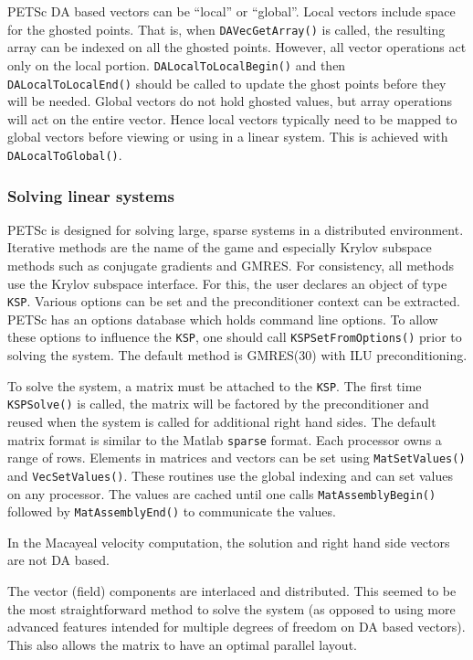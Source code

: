 \documentclass[11pt,final]{amsart}
\renewcommand{\t}[1]{\texttt{#1}}
\begin{document}
PETSc DA based vectors can be ``local'' or ``global''. Local vectors include space for the
ghosted points. That is, when \texttt{DAVecGetArray()} is called, the resulting array can
be indexed on all the ghosted points. However, all vector operations act only on the local
portion. \texttt{DALocalToLocalBegin()} and then \texttt{DALocalToLocalEnd()} should be
called to update the ghost points before they will be needed. Global vectors do not hold
ghosted values, but array operations will act on the entire vector. Hence local vectors
typically need to be mapped to global vectors before viewing or using in a linear system.
This is achieved with \texttt{DALocalToGlobal()}.

\subsubsection{Solving linear systems}
PETSc is designed for solving large, sparse systems in a distributed environment.
Iterative methods are the name of the game and especially Krylov subspace methods such as
conjugate gradients and GMRES. For consistency, all methods use the Krylov subspace
interface. For this, the user declares an object of type \texttt{KSP}. Various options can
be set and the preconditioner context can be extracted. PETSc has an options database
which holds command line options. To allow these options to influence the \t{KSP}, one
should call \t{KSPSetFromOptions()} prior to solving the system. The default method is
GMRES(30) with ILU preconditioning.

To solve the system, a matrix must be attached to the \t{KSP}. The first time
\t{KSPSolve()} is called, the matrix will be factored by the preconditioner and reused
when the system is called for additional right hand sides. The default matrix format is
similar to the Matlab \t{sparse} format. Each processor owns a range of rows. Elements in
matrices and vectors can be set using \t{MatSetValues()} and \t{VecSetValues()}. These
routines use the global indexing and can set values on any processor. The values are
cached until one calls \t{MatAssemblyBegin()} followed by \t{MatAssemblyEnd()} to
communicate the values.

In the Macayeal velocity computation, the solution and right hand side vectors are not DA
based.

The vector (field) components are interlaced and distributed. This seemed to be the
most straightforward method to solve the system (as opposed to using more advanced
features intended for multiple degrees of freedom on DA based vectors). This also allows
the matrix to have an optimal parallel layout.
\end{document}
